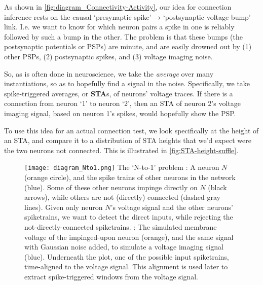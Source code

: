 
As shown in \cref{fig:diagram_Connectivity-Activity}, our idea for connection inference rests on the causal `presynaptic spike' → `postsynaptic voltage bump' link. I.e. we want to know for which neuron pairs a spike in one is reliably followed by such a bump in the other. The problem is that these bumps (the postsynaptic potentials or PSPs) are minute, and are easily drowned out by (1) other PSPs, (2) postsynaptic spikes, and (3) voltage imaging noise.

So, as is often done in neuroscience, we take the \emph{average} over many instantiations, so as to hopefully find a signal in the noise. Specifically, we take spike-triggered averages, or \textbf{STA}s, of neurons' voltage traces. If there is a connection from neuron `1' to neuron `2', then an STA of neuron 2's voltage imaging signal, based on neuron 1's spikes, would hopefully show the PSP.

To use this idea for an actual connection test, we look specifically at the height of an STA, and compare it to a distribution of STA heights that we'd expect were the two neurons not connected. This is illustrated in \cref{fig:STA-height-suffle}.


\begin{figure}
    \vspace*{2em}
    \hspace*{-1em}
    \texttt{[image: diagram\_Nto1.png]}
    \vspace*{-1.4em}
    \captionn
        {The `N-to-1' problem}
        {\Left: A neuron $N$ (orange circle), and the spike trains of other neurons in the network (blue). Some of these other neurons impinge directly on $N$ (black arrows), while others are not (directly) connected (dashed gray lines). Given only neuron $N$'s voltage signal and the other neurons' spiketrains, we want to detect the direct inputs, while rejecting the not-directly-connected spiketrains.\newline
        \Right: The simulated membrane voltage of the impinged-upon neuron (orange), and the same signal with Gaussian noise added, to simulate a voltage imaging signal (blue). Underneath the plot, one of the possible input spiketrains, time-aligned to the voltage signal.
        This alignment is used later to extract spike-triggered windows from the voltage signal.}
    \label{fig:diagram_Nto1}
\end{figure}


